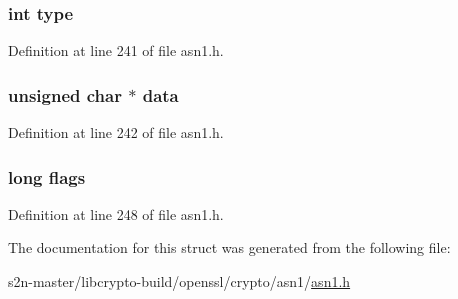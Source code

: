 \subsubsection[{\texorpdfstring{type}{type}}]{\setlength{\rightskip}{0pt plus 5cm}int type}\hypertarget{structasn1__string__st_ac765329451135abec74c45e1897abf26}{}\label{structasn1__string__st_ac765329451135abec74c45e1897abf26}


Definition at line 241 of file asn1.\+h.

\subsubsection[{\texorpdfstring{data}{data}}]{\setlength{\rightskip}{0pt plus 5cm}unsigned char $\ast$ data}\hypertarget{structasn1__string__st_a6f0f3eff16962881999799f7b0f66a0a}{}\label{structasn1__string__st_a6f0f3eff16962881999799f7b0f66a0a}


Definition at line 242 of file asn1.\+h.

\subsubsection[{\texorpdfstring{flags}{flags}}]{\setlength{\rightskip}{0pt plus 5cm}long flags}\hypertarget{structasn1__string__st_a6a36e81b5744ff152979cae202d37e78}{}\label{structasn1__string__st_a6a36e81b5744ff152979cae202d37e78}


Definition at line 248 of file asn1.\+h.



The documentation for this struct was generated from the following file\+:\begin{DoxyCompactItemize}
\item 
s2n-\/master/libcrypto-\/build/openssl/crypto/asn1/\hyperlink{crypto_2asn1_2asn1_8h}{asn1.\+h}\end{DoxyCompactItemize}
